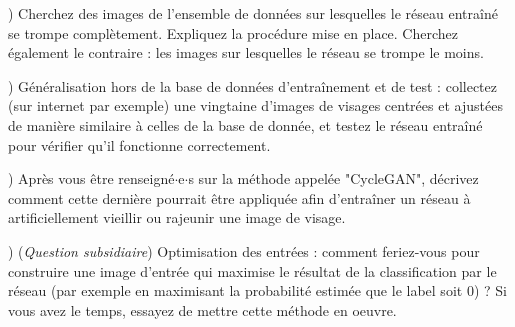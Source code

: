 \documentclass[a4paper,11pt]{article}
\begin{document}
) Cherchez des images de l'ensemble de données sur lesquelles le réseau entraîné se trompe complètement. Expliquez la procédure mise en place. Cherchez également le contraire : les images sur lesquelles le réseau se trompe le moins.
\newline

) Généralisation hors de la base de données d'entraînement et de test : collectez (sur internet par exemple) une vingtaine d'images de visages centrées et ajustées de manière similaire à celles de la base de donnée, et testez le réseau entraîné pour vérifier qu'il fonctionne correctement.
\newline

) Après vous être renseigné$\cdot$e$\cdot$s sur la méthode appelée "CycleGAN", décrivez comment cette dernière pourrait être appliquée afin d'entraîner un réseau à artificiellement vieillir ou rajeunir une image de visage.
\newline 

) (\emph{Question subsidiaire}) Optimisation des entrées : comment feriez-vous pour construire une image d'entrée qui maximise le résultat de la classification par le réseau (par exemple en maximisant la probabilité estimée que le label soit 0) ? Si vous avez le temps, essayez de mettre cette méthode en oeuvre.
\end{document}
